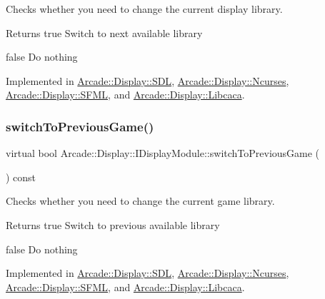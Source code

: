 Checks whether you need to change the current display library. 

\begin{DoxyReturn}{Returns}
true Switch to next available library 

false Do nothing 
\end{DoxyReturn}


Implemented in \mbox{\hyperlink{classArcade_1_1Display_1_1SDL_a91bee5a87dfcacb4da9d6d148dc52a2b}{Arcade\+::\+Display\+::\+S\+DL}}, \mbox{\hyperlink{classArcade_1_1Display_1_1Ncurses_a921c8a8559cd48419aafda8e34c1b653}{Arcade\+::\+Display\+::\+Ncurses}}, \mbox{\hyperlink{classArcade_1_1Display_1_1SFML_a3e7d385aaa46e9137f41e4d78d5e233c}{Arcade\+::\+Display\+::\+S\+F\+ML}}, and \mbox{\hyperlink{classArcade_1_1Display_1_1Libcaca_ada47921d3d90780e6817bddd1efcd017}{Arcade\+::\+Display\+::\+Libcaca}}.

\mbox{\label{classArcade_1_1Display_1_1IDisplayModule_a3bbbfe00907c8f3e4c7ef1aadedcc513}} 
\subsubsection{\texorpdfstring{switchToPreviousGame()}{switchToPreviousGame()}}
{\footnotesize\ttfamily virtual bool Arcade\+::\+Display\+::\+I\+Display\+Module\+::switch\+To\+Previous\+Game (\begin{DoxyParamCaption}{ }\end{DoxyParamCaption}) const\hspace{0.3cm}{\ttfamily [pure virtual]}}



Checks whether you need to change the current game library. 

\begin{DoxyReturn}{Returns}
true Switch to previous available library 

false Do nothing 
\end{DoxyReturn}


Implemented in \mbox{\hyperlink{classArcade_1_1Display_1_1SDL_ad9bf495fb4e7499c81b2d65a0602e7f1}{Arcade\+::\+Display\+::\+S\+DL}}, \mbox{\hyperlink{classArcade_1_1Display_1_1Ncurses_ad2e7818db1e8f3328083ed6cab2f7517}{Arcade\+::\+Display\+::\+Ncurses}}, \mbox{\hyperlink{classArcade_1_1Display_1_1SFML_ae5dbff9dd547fb0a09e478e11bf74c11}{Arcade\+::\+Display\+::\+S\+F\+ML}}, and \mbox{\hyperlink{classArcade_1_1Display_1_1Libcaca_a2bb528b251b6845c1f429f9f7dc58f4f}{Arcade\+::\+Display\+::\+Libcaca}}.

